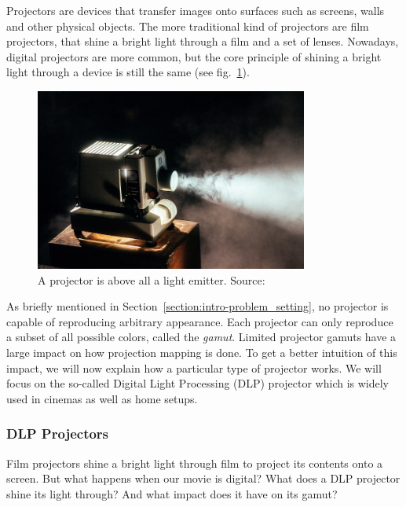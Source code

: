 Projectors are devices that transfer images onto surfaces such as screens, walls and other physical objects. The more traditional kind of projectors are film projectors, that shine a bright light through a film and a set of lenses. Nowadays, digital projectors are more common, but the core principle of shining a bright light through a device is still the same (see fig.~\ref{fig:background_projector}).

\begin{figure}[ht]
    \centering
    \includegraphics[width=0.8\textwidth]{images/02-projector.jpg}
    \caption{A projector is above all a light emitter. Source: \citet{ImageProjector}}
    \label{fig:background_projector}
\end{figure}

As briefly mentioned in Section~\ref{section:intro-problem_setting}, no projector is capable of reproducing arbitrary appearance. Each projector can only reproduce a subset of all possible colors, called the \textit{gamut}. Limited projector gamuts have a large impact on how projection mapping is done. To get a better intuition of this impact, we will now explain how a particular type of projector works. We will focus on the so-called Digital Light Processing (DLP) projector which is widely used in cinemas as well as home setups.

\subsubsection{DLP Projectors}
\label{section:background-projection_mapping-projectors-DLP}

Film projectors shine a bright light through film to project its contents onto a screen. But what happens when our movie is digital? What does a DLP projector shine its light through? And what impact does it have on its gamut?

